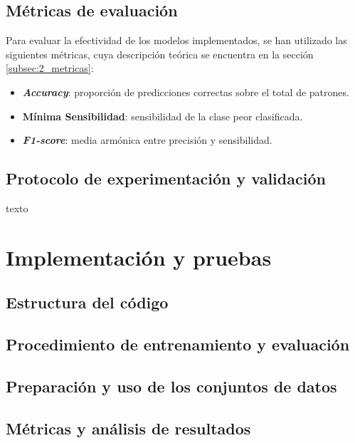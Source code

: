 \subsection{Métricas de evaluación}
\label{subsec:6_metricas}

Para evaluar la efectividad de los modelos implementados, se han utilizado las siguientes métricas, cuya descripción teórica se encuentra en la sección \ref{subsec:2_metricas}:

\begin{itemize}
	\item \textbf{\textit{Accuracy}}: proporción de predicciones correctas sobre el total de patrones.
	\item \textbf{Mínima Sensibilidad}: sensibilidad de la clase peor clasificada.
	\item \textbf{\textit{F1-score}}: media armónica entre precisión y sensibilidad.
\end{itemize}

\subsection{Protocolo de experimentación y validación}
\label{subsec:protocolo_exper}

texto

\section{Implementación y pruebas}
\label{sec:implementacion}

\subsection{Estructura del código}
\label{subsec:estructura_codigo}

\subsection{Procedimiento de entrenamiento y evaluación}
\label{subsec:procedimiento}

\subsection{Preparación y uso de los conjuntos de datos}
\label{subsec:datos_experimentales}

\subsection{Métricas y análisis de resultados}
\label{subsec:metricas_pruebas}

